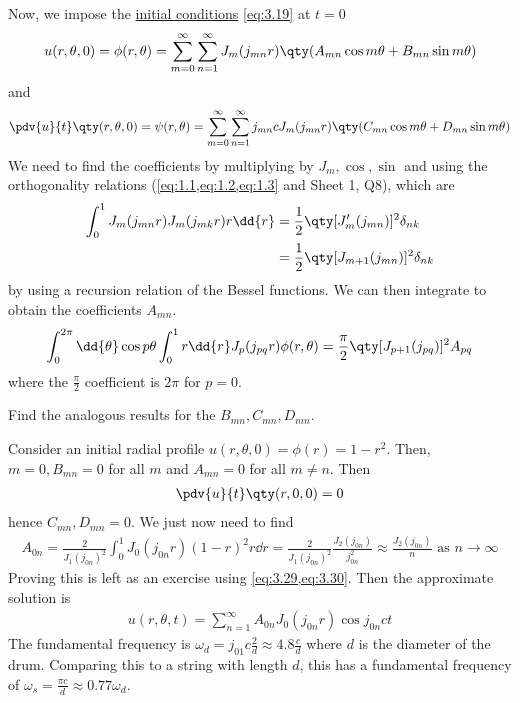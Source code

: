 Now, we impose the \underline{initial conditions} \cref{eq:3.19} at $t = 0$
\begin{align} \label{eq:3.37}
	u(r,\theta,0) = \phi(r,\theta) = \sum_{m=0}^\infty \sum_{n=1}^\infty J_m (j_{mn}r) \qty( A_{mn} \cos m \theta + B_{mn} \sin m\theta )
\end{align}
and
\begin{align*}
	\pdv{u}{t}\qty(r,\theta,0) = \psi(r,\theta) = \sum_{m=0}^\infty \sum_{n=1}^\infty j_{mn} c J_m (j_{mn}r) \qty( C_{mn} \cos m \theta + D_{mn} \sin m\theta )
\end{align*}
We need to find the coefficients by multiplying by $J_m, \cos, \sin$ and using the orthogonality relations (\cref{eq:1.1,eq:1.2,eq:1.3} and Sheet 1, Q8), which are
\begin{align}
	\int_0^1 J_m(j_{mn} r) J_m(j_{mk} r) r \dd{r} &= \frac{1}{2}\qty[J_m'(j_{mn})]^2 \delta_{nk} \label{eq:3.38} \\
	&= \frac{1}{2}\qty[J_{m+1}(j_{mn})]^2 \delta_{nk} \label{eq:3.39}
\end{align}
by using a recursion relation of the Bessel functions.
We can then integrate to obtain the coefficients $A_{mn}$.
\begin{align*}
	\int_0^{2\pi} \dd{\theta} \cos p\theta \int_0^1 r \dd{r} J_p(j_{pq} r) \phi(r,\theta) = \frac{\pi}{2}\qty[J_{p+1}(j_{pq})]^2 A_{pq}
\end{align*}
where the $\frac{\pi}{2}$ coefficient is $2\pi$ for $p = 0$.
\begin{exercise}
	Find the analogous results for the $B_{mn}, C_{mn}, D_{mn}$.
\end{exercise} 
 
\begin{example}
	Consider an initial radial profile $u(r,\theta,0) = \phi(r) = 1 - r^2$.
	Then, $m = 0, B_{mn} = 0$ for all $m$ and $A_{mn} = 0$ for all $m \neq n$.
	Then
	\begin{align*}
		\pdv{u}{t}\qty(r,0,0) = 0
	\end{align*}
	hence $C_{mn}, D_{mn} = 0$.
	We just now need to find
	\begin{align*}
		A_{0n} = \frac{2}{J_1(j_{0n})^2} \int_0^1 J_0(j_{0n}r)(1-r)^2 r\dd{r} = \frac{2}{J_1(j_{0n})^2} \frac{J_2(j_{0n})}{j_{0n}^2} \approx \frac{J_2(j_{0n})}{n} \text{ as } n \to \infty
	\end{align*}
	Proving this is left as an exercise using \cref{eq:3.29,eq:3.30}.
	Then the approximate solution is
	\begin{align*}
		u(r,\theta,t) = \sum_{n=1}^\infty A_{0n} J_0(j_{0n}r)\cos j_{0n} ct
	\end{align*}
	The fundamental frequency is $\omega_d = j_{01} c \frac{2}{d} \approx 4.8\frac{c}{d}$ where $d$ is the diameter of the drum.
	Comparing this to a string with length $d$, this has a fundamental frequency of $\omega_s = \frac{\pi c}{d} \approx 0.77 \omega_d$.
\end{example}